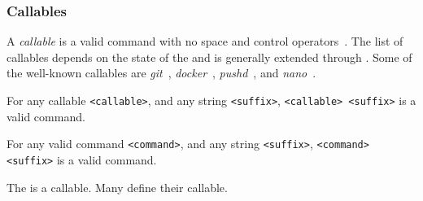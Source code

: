 \subsubsection{Callables}\label{callables}\label{callable}

A \emph{callable} is a valid command with no space and control operators~\cite{control_operators}. The list of callables depends on the state of the  and is generally extended through . Some of the well-known callables are \emph{git}~\cite{git}, \emph{docker}~\cite{docker}, \emph{pushd}~\cite{pushd}, and \emph{nano}~\cite{nano}. 

\begin{theorem}
For any callable \texttt{<callable>}, and any string \texttt{<suffix>}, \texttt{<callable> <suffix>} is a valid command.
\end{theorem}

\begin{theorem}
For any valid command \texttt{<command>}, and any string \texttt{<suffix>}, \texttt{<command> <suffix>} is a valid command.
\end{theorem}

The  is a callable. Many  define their callable. 